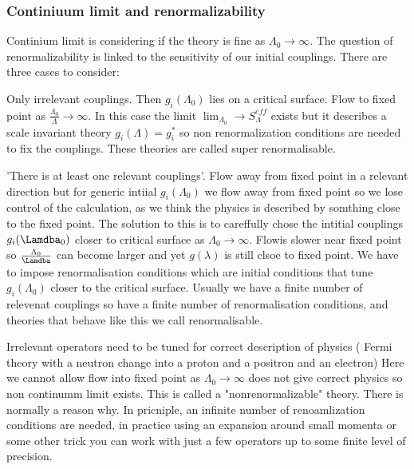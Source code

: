 \documentclass{article}
\begin{document}
\subsubsection{Continiuum limit and renormalizability}
Continium limit is considering if the theory is fine as $\Lambda_0 \rightarrow \infty$. The question of renormalizability is linked to the sensitivity of our initial couplings. There are three cases to consider:
\begin{itemlist}
\item Only irrelevant couplings. Then $g_i(\Lambda_0)$ lies on a critical surface. Flow to fixed point as $\frac{\Lambda_0}{\Lambda} \rightarrow \infty$. In this case the limit $\lim_{\Lambda_0} \rightarrow S_{\Lambda}^{eff}$ exists but it describes a scale invariant theory $g_i(\Lambda) = g_i^*$ so non renormalization conditions are needed to fix the couplings. These theories are called super renormalisable.\\
        \item 'There is at least one relevant couplings'. Flow away from fixed point in a relevant direction but for generic intiial  $g_i(\Lambda_0)$ we flow away from fixed point so we lose control of the calculation, as we think the physics is described by somthing close to the fixed point. The solution to this is to careffully chose the intitial couplings $g_i(\Lamdba_0)$ closer to critical surface as $\Lambda_0 \rightarrow \infty$. Flowis slower near fixed point so $\frac{\Lambda_0}{\Lamdba}$ can become larger and yet $g(\lambda)$ is still clsoe to fixed point. We have to impose renormalisation conditions which are initial conditions that tune $g_i(\Lambda_0)$ closer to the critical surface. Usually we have a finite number of relevenat couplings so have a finite number of renormalisation conditions, and theories that behave like this we call renormalisable.\\
        \item Irrelevant operators need to be tuned for correct description of physics ( Fermi theory with a neutron change into  a proton and a positron and an electron) Here we cannot allow flow into fixed point as $\Lambda_0 \rightarrow \infty$ does not give correct physics so non continumm limit exists. This is called a "nonrenormalizable" theory. There is normally a reason why. In pricniple, an infinite number of renoamlization conditions are needed, in practice using an expansion around small momenta or some other trick you can work with just a few operators up to some finite level of precision. 
\end{itemlist}
\end{document}
